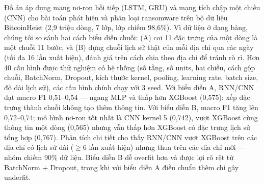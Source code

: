 Đồ án áp dụng mạng nơ-ron hồi tiếp (LSTM, GRU) và mạng tích chập một chiều (CNN) cho bài toán phát hiện và phân loại ransomware
trên bộ dữ liệu BitcoinHeist (2,9 triệu dòng, 7 lớp, lớp  chiếm 98,6\%). Vì dữ liệu ở dạng bảng, chúng tôi so sánh hai
cách biểu diễn chuỗi: (A) coi 11 đặc trưng của một dòng là một chuỗi 11 bước, và (B) dựng chuỗi lịch sử thật của mỗi địa chỉ
qua các ngày (tối đa 16 lần xuất hiện), đánh giá trên cách chia theo địa chỉ để tránh rò rỉ. Hơn 40 cấu hình được thử nghiệm có
hệ thống (số tầng, số units, hai chiều, cách gộp chuỗi, BatchNorm, Dropout, kích thước kernel, pooling, learning rate, batch size,
độ dài lịch sử), các cấu hình chính chạy với 3 seed. Với biểu diễn A, RNN/CNN đạt macro F1 0,51--0,54 --- ngang MLP và thấp hơn
XGBoost (0,575): xếp đặc trưng thành chuỗi không tạo thêm thông tin. Với biểu diễn B, macro F1 tăng lên 0,72--0,74; mô hình
nơ-ron tốt nhất là CNN kernel 5 (0,742), vượt XGBoost cùng thông tin một dòng (0,565) nhưng vẫn thấp hơn XGBoost có đặc trưng lịch sử
tổng hợp (0,767). Phân tích chi tiết cho thấy RNN/CNN vượt XGBoost trên các địa chỉ có lịch sử dài ($\ge$6 lần xuất hiện) nhưng
thua trên các địa chỉ mới --- nhóm chiếm 90\% dữ liệu. Biểu diễn B dễ overfit hơn và được lợi rõ rệt từ BatchNorm + Dropout,
trong khi với biểu diễn A điều chuẩn thêm chỉ gây underfit.
